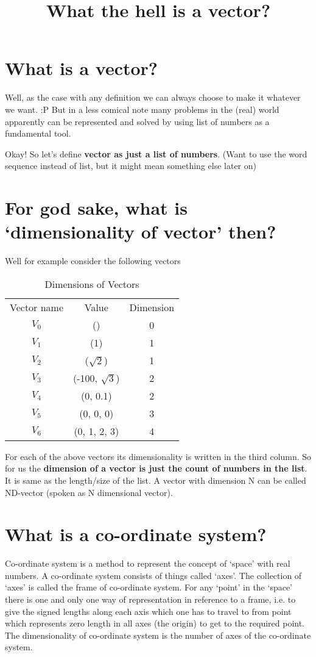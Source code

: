 \documentclass[12pt]{article}
\title{What the hell is a vector?}
\author{}
\begin{document}
\maketitle

\section{What is a vector?}
Well, as the case with any definition we can always choose to make it whatever we want. :P
But in a less comical note many problems in the (real) world apparently can be represented and solved by using list of numbers as a fundamental tool.

Okay! So let's define \textbf{vector as just a list of numbers}. (Want to use the word sequence instead of list, but it might mean something else later on)

\section{For god sake, what is `dimensionality of vector' then?}
Well for example consider the following vectors

\begin{table}[h]
  \centering
  \begin{tabular}{ c  c  c }
    Vector name & Value & Dimension\\
    $ V_0 $ & () & 0\\
    $ V_1 $ & (1) & 1\\
    $ V_2 $ & ($\sqrt{2}$) & 1\\
    $ V_3 $ & (-100, $\sqrt{3}$) & 2\\
    $ V_4 $ & (0, 0.1) & 2\\
    $ V_5 $ & (0, 0, 0) & 3\\
    $ V_6 $ & (0, 1, 2, 3) & 4\\
  \end{tabular}
\caption{Dimensions of Vectors}
\label{tab:dim}
\end{table}

For each of the above vectors its dimensionality is written in the third column.
So for us the \textbf{dimension of a vector is just the count of numbers in the list}.
It is same as the length/size of the list. A vector with dimension N can be called ND-vector (spoken as N dimensional vector).

\pagebreak

\section{What is a co-ordinate system?}
Co-ordinate system is a method to represent the concept of `space' with real numbers.
A co-ordinate system consists of things called `axes'. The collection of `axes' is called the frame of co-ordinate system.
For any `point' in the `space' there is one and only one way of representation in reference to a frame, i.e. to give the signed lengths along each axis which one has to travel to from point which represents zero length in all axes (the origin) to get to the required point. The dimensionality of co-ordinate system is the number of axes of the co-ordinate system.
\end{document}
